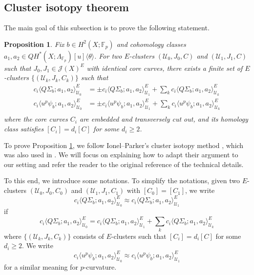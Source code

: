 \documentclass[reqno]{amsart}
\numberwithin{equation}{section}
\numberwithin{equation}{section}
\numberwithin{equation}{section}
\newtheorem{prop}[thm]{Proposition}
\theoremstyle{definition}
\theoremstyle{remark}
\theoremstyle{remark}
\begin{document}
\subsection{Cluster isotopy theorem}
The main goal of this subsection is to prove the following statement.

\begin{prop}\label{prop:isotopy}
    Fix $b \in H^2(X;\mathbb{F}_p)$ and cohomology classes $a_1, a_2 \in QH^*(X;\Lambda_{\mathbb{F}_p})[u]\langle \theta \rangle$. For two $E$-clusters $(\mathcal{U}_0, J_0, C)$ and $(\mathcal{U}_1, J_1, C)$ such that $J_0, J_1 \in \mathcal{J}(X)^E$ with identical core curves, there exists a finite set of $E$-clusters $\{ (\mathcal{U}_k, J_k, C_k)\}$ such that 
    \begin{equation}
    \begin{aligned}
    c_i \langle Q\Sigma_b ; a_1, a_2 \rangle^E_{\mathcal{U}_0}  &= \pm c_i \langle Q\Sigma_b ; a_1, a_2 \rangle^E_{\mathcal{U}_1} + \sum_k c_i \langle Q\Sigma_b ; a_1, a_2 \rangle^E_{\mathcal{U}_k}
    \\
    c_i \langle  u^p \psi_b; a_1, a_2 \rangle^E_{\mathcal{U}_0}  &= \pm c_i \langle u^p \psi_b; a_1, a_2 \rangle^E_{\mathcal{U}_1} + \sum_k c_i \langle u^p  \psi_b; a_1, a_2 \rangle^E_{\mathcal{U}_k}\\
    \end{aligned}
    \end{equation}
    where the core curves $C_i$ are embedded and transversely cut out, and its homology class satisfies $[C_i] = d_i [C]$ for some $d_i \geq 2$.
\end{prop}

To prove Proposition \ref{prop:isotopy}, we follow Ionel--Parker's cluster isotopy method \cite[Section 7]{IP-GV}, which was also used in \cite[Section 3.3]{doan2021gopakumar}. We will focus on explaining how to adapt their argument to our setting and refer the reader to the original reference of the technical details.

To this end, we introduce some notations. To simplify the notations, given two $E$-clusters $(\mathcal{U}_0, J_0, C_0)$ and $(\mathcal{U}_1, J_1, C_1)$ with $[C_0] = [C_1]$, we write
\begin{equation}
    c_i \langle Q\Sigma_b ; a_1, a_2 \rangle^E_{\mathcal{U}_0} \approx c_i \langle Q\Sigma_b ; a_1, a_2 \rangle^E_{\mathcal{U}_1}
\end{equation}
if
\begin{equation}
    c_i \langle Q\Sigma_b ; a_1, a_2 \rangle^E_{\mathcal{U}_0}  = c_i \langle Q\Sigma_b ; a_1, a_2 \rangle^E_{\mathcal{U}_1} + \sum_k c_i \langle Q\Sigma_b ; a_1, a_2 \rangle^E_{\mathcal{U}_k}
\end{equation}
where $\{ (\mathcal{U}_k, J_k, C_k)\}$ consists of $E$-clusters such that $[C_i] = d_i [C]$ for some $d_i \geq 2$. We write
\begin{equation}
    c_i \langle  u^p \psi_b; a_1, a_2 \rangle^E_{\mathcal{U}_0}  \approx  c_i \langle  u^p \psi_b; a_1, a_2 \rangle^E_{\mathcal{U}_1}
\end{equation}
for a similar meaning for $p$-curvature.
\end{document}
